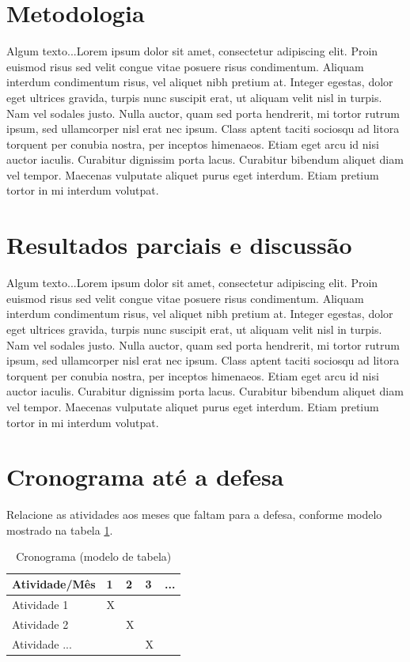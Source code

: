\documentclass[quali]{mpit}
\begin{document}
\section{Metodologia}

Algum texto...Lorem ipsum dolor sit amet, consectetur adipiscing elit. Proin euismod risus sed velit congue vitae posuere risus condimentum. Aliquam interdum condimentum risus, vel aliquet nibh pretium at. Integer egestas, dolor eget ultrices gravida, turpis nunc suscipit erat, ut aliquam velit nisl in turpis. Nam vel sodales justo. Nulla auctor, quam sed porta hendrerit, mi tortor rutrum ipsum, sed ullamcorper nisl erat nec ipsum. Class aptent taciti sociosqu ad litora torquent per conubia nostra, per inceptos himenaeos. Etiam eget arcu id nisi auctor iaculis. Curabitur dignissim porta lacus. Curabitur bibendum aliquet diam vel tempor. Maecenas vulputate aliquet purus eget interdum. Etiam pretium tortor in mi interdum volutpat.

\section{Resultados parciais e discussão}

Algum texto...Lorem ipsum dolor sit amet, consectetur adipiscing elit. Proin euismod risus sed velit congue vitae posuere risus condimentum. Aliquam interdum condimentum risus, vel aliquet nibh pretium at. Integer egestas, dolor eget ultrices gravida, turpis nunc suscipit erat, ut aliquam velit nisl in turpis. Nam vel sodales justo. Nulla auctor, quam sed porta hendrerit, mi tortor rutrum ipsum, sed ullamcorper nisl erat nec ipsum. Class aptent taciti sociosqu ad litora torquent per conubia nostra, per inceptos himenaeos. Etiam eget arcu id nisi auctor iaculis. Curabitur dignissim porta lacus. Curabitur bibendum aliquet diam vel tempor. Maecenas vulputate aliquet purus eget interdum. Etiam pretium tortor in mi interdum volutpat.

\section{Cronograma até a defesa}

Relacione as atividades aos meses que faltam para a defesa, conforme modelo mostrado na tabela \ref{crono}.

\begin{table}[h]
\centering
\caption{Cronograma (modelo de tabela)}
\label{crono}
\begin{tabular}{l | l | l | l | l}
\hline
\textbf{Atividade/Mês} & \textbf{1} & \textbf{2} & \textbf{3} & ... \\ \hline \hline
Atividade 1   & X  &   &   &     \\ \hline
Atividade 2   &   & X  &   &     \\ \hline
Atividade ... &   &   &  X &     \\ \hline
\end{tabular}
\end{table}
\end{document}
